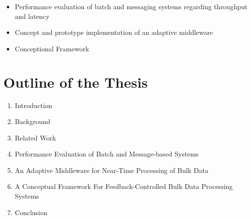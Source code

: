 \begin{itemize}
	\item Performance evaluation of batch and messaging systems regarding throughput and latency
	\item Concept and prototype implementation of an adaptive middleware 
	\item Conceptional Framework
\end{itemize}

\section{Outline of the Thesis}\label{sec:thesis_outline}

\begin{enumerate}
	\item Introduction
	\item Background
	\item Related Work
	\item Performance Evaluation of Batch and Message-based Systems
	\item An Adaptive Middleware for Near-Time Processing of Bulk Data
	\item A Conceptual Framework For Feedback-Controlled Bulk Data Processing Systems
	\item Conclusion
\end{enumerate}